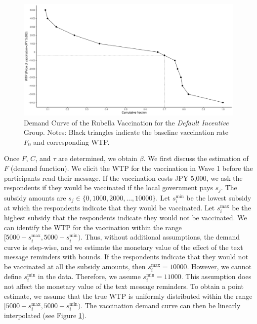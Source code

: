 \documentclass[
]{article}
\begin{document}
\begin{figure}[t]
\includegraphics{discussion-paper_files/figure-latex/demand-function-1} \caption{Demand Curve of the Rubella Vaccination for the \emph{Default Incentive} Group. Notes: Black triangles indicate the baseline vaccination rate $F_0$ and corresponding WTP.}\label{fig:demand-function}
\end{figure}

Once \(F\), \(C\), and \(\tau\) are determined, we obtain \(\beta\). We first discuss the estimation of \(F\) (demand function). We elicit the WTP for the vaccination in Wave 1 before the participants read their message. If the vaccination costs JPY 5,000, we ask the respondents if they would be vaccinated if the local government pays \(s_j\). The subsidy amounts are \(s_j \in \{0, 1000, 2000, \ldots , 10000\}\). Let \(s_i^{\text{min}}\) be the lowest subsidy at which the respondents indicate that they would be vaccinated. Let \(s_i^{\text{max}}\) be the highest subsidy that the respondents indicate they would not be vaccinated. We can identify the WTP for the vaccination within the range \([5000 - s_i^{\text{max}}, 5000 - s_i^{\text{min}})\). Thus, without additional assumptions, the demand curve is step-wise, and we estimate the monetary value of the effect of the text message reminders with bounds. If the respondents indicate that they would not be vaccinated at all the subsidy amounts, then \(s_i^{\text{max}} = 10000\). However, we cannot define \(s_i^{\text{min}}\) in the data. Therefore, we assume \(s_i^{\text{min}} = 11000\). This assumption does not affect the monetary value of the text message reminders. To obtain a point estimate, we assume that the true WTP is uniformly distributed within the range \([5000 - s_i^{\text{max}}, 5000 - s_i^{\text{min}})\). The vaccination demand curve can then be linearly interpolated (see Figure \ref{fig:demand-function}).
\end{document}
